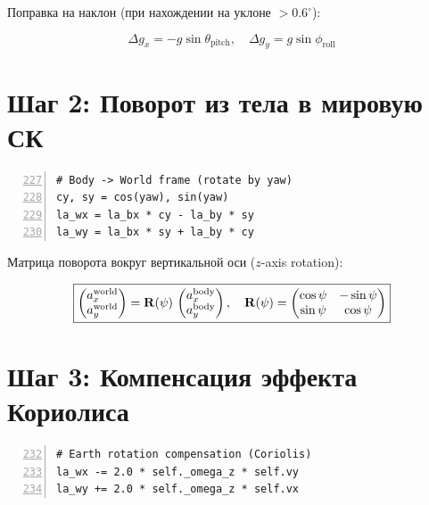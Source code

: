Поправка на наклон (при нахождении на уклоне $> 0.6^\circ$):

\begin{equation}
  \Delta g_x = -g \sin\theta_{\text{pitch}}, \quad
  \Delta g_y = g \sin\phi_{\text{roll}}
  \label{eq:slope_correction}
\end{equation}

\section{Шаг 2: Поворот из тела в мировую СК}

\begin{filebox}[title={\filepath{accel\_position.py}, строки 227--230}]
\begin{lstlisting}[style=pythonstyle, numbers=left, firstnumber=227]
# Body -> World frame (rotate by yaw)
cy, sy = cos(yaw), sin(yaw)
la_wx = la_bx * cy - la_by * sy
la_wy = la_bx * sy + la_by * cy
\end{lstlisting}
\end{filebox}

Матрица поворота вокруг вертикальной оси ($z$-axis rotation):

\begin{equation}
  \boxed{
  \begin{pmatrix} a^{\text{world}}_x \\ a^{\text{world}}_y \end{pmatrix}
  = \mathbf{R}(\psi)\,
  \begin{pmatrix} a^{\text{body}}_x \\ a^{\text{body}}_y \end{pmatrix},
  \quad
  \mathbf{R}(\psi) = \begin{pmatrix} \cos\psi & -\sin\psi \\ \sin\psi & \cos\psi \end{pmatrix}
  }
  \label{eq:body_to_world}
\end{equation}

\section{Шаг 3: Компенсация эффекта Кориолиса}

\begin{filebox}[title={\filepath{accel\_position.py}, строки 232--234}]
\begin{lstlisting}[style=pythonstyle, numbers=left, firstnumber=232]
# Earth rotation compensation (Coriolis)
la_wx -= 2.0 * self._omega_z * self.vy
la_wy += 2.0 * self._omega_z * self.vx
\end{lstlisting}
\end{filebox}

